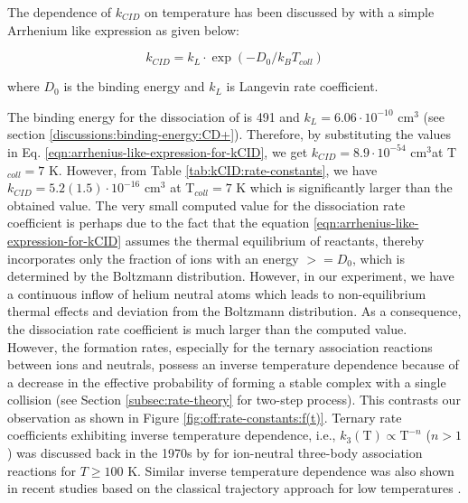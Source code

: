 The dependence of $k_{CID}$ on temperature has been discussed by \citet{SGA2015}
with a simple Arrhenium like expression as given below:

\begin{equation}
    k_{CID} = k_{L} \cdot \exp(-D_{0}/k_B T_{coll})
    \label{eqn:arrhenius-like-expression-for-kCID}
\end{equation}

where $D_0$ is the binding energy and $k_L$ is Langevin rate coefficient.

The binding energy for the dissociation of \CD is 491 \wnn and $k_L = 6.06 \cdot 10^{-10}$ cm$^3$\pers 
(see section \ref{discussions:binding-energy:CD+}). 
Therefore, by substituting the values in Eq. \ref{eqn:arrhenius-like-expression-for-kCID}, we get 
$k_{CID} = 8.9 \cdot 10^{-54}$ cm$^3$\pers at T$_{coll}=7$ K. However, from Table
\ref{tab:kCID:rate-constants}, we have $k_{CID} = 5.2(1.5) \cdot 10^{-16}$ cm$^3$\pers 
at T$_{coll}=7$ K which is significantly larger than the obtained value.
The very small computed value for the dissociation rate coefficient is perhaps due to the fact that the    
equation \ref{eqn:arrhenius-like-expression-for-kCID} assumes the thermal equilibrium
of reactants, thereby incorporates only the fraction
of ions with an energy $>= D_0$, which is determined by the Boltzmann distribution.  
However, in our experiment, we have a continuous inflow of helium neutral atoms
which leads to non-equilibrium thermal effects and deviation from the Boltzmann distribution.
As a consequence, the dissociation rate coefficient is much larger than the computed value.\\

However, the formation rates, especially for the ternary association reactions
between ions and neutrals, possess an inverse temperature
dependence because of a decrease in the effective probability of forming a
stable complex with a single collision \cite{herbst_dense_1988} (see Section
\ref{subsec:rate-theory} for two-step process). This contrasts our observation
as shown in Figure \ref{fig:off:rate-constants:f(t)}. Ternary rate coefficients exhibiting
inverse temperature dependence, i.e., $k_3 (\text{T}) \propto \text{T}^{-n}$ ($n > 1$) 
was discussed back in the 1970s by \citet{Herbst1979} for ion-neutral
three-body association reactions for $T \geq 100$ K.
Similar inverse temperature dependence was also shown in recent studies based on the classical trajectory approach for low temperatures \cite{perez-rios_communication_2015, greene_universal_2017}.

